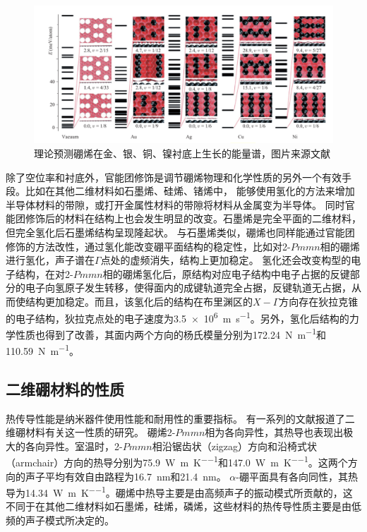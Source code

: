 \begin{figure}[bt]
  \includegraphics[width=1.0\textwidth]{figs/ch1_borophene_energy_spectra.png}
  \centering
  \caption{理论预测硼烯在金、银、铜、镍衬底上生长的能量谱，图片来源文献\cite{zhang2015two}}
  \label{fig:ch1_borophene_energy_spectra}
\end{figure}

除了空位率和衬底外，官能团修饰是调节硼烯物理和化学性质的另外一个有效手段。比如在其他二维材料如石墨烯、硅烯、锗烯中，
能够使用氢化的方法来增加半导体材料的带隙，或打开金属性材料的带隙将材料从金属变为半导体\cite{balog2010bandgap,bhattacharya2011strain,houssa2011electronic}。
同时官能团修饰后的材料在结构上也会发生明显的改变。石墨烯是完全平面的二维材料，但完全氢化后石墨烯结构呈现隆起状。
与石墨烯类似，硼烯也同样能通过官能团修饰的方法改性，通过氢化能改变硼平面结构的稳定性，比如对2-$Pmmn$相的硼烯进行氢化，声子谱在$\Gamma$点处的虚频消失，结构上更加稳定\cite{xu2016hydrogenated,wang2016high}。
氢化还会改变构型的电子结构\cite{xu2016hydrogenated}，在对2-$Pmmn$相的硼烯氢化后，原结构对应电子结构中电子占据的反键部分的电子向氢原子发生转移，使得面内的成键轨道完全占据，反键轨道无占据，从而使结构更加稳定。而且，该氢化后的结构在布里渊区的$X-\Gamma$方向存在狄拉克锥的电子结构，狄拉克点处的电子速度为\SI{3.5e6}{\metre\per\second}\cite{xu2016hydrogenated}。另外，氢化后结构的力学性质也得到了改善，其面内两个方向的杨氏模量分别为\SI{172.24}{\N\per\meter}和\SI{110.59}{\N\per\meter}\cite{wang2016high}。

\subsection{二维硼材料的性质}
热传导性能是纳米器件使用性能和耐用性的重要指标。
有一系列的文献\cite{li2018stretch, mortazavi2018borophene, zhou2017superior, liu2017anisotropic, sun2016first, mortazavi2017anomalous}报道了二维硼材料有关这一性质的研究。
硼烯2-$Pmmn$相为各向异性，其热导也表现出极大的各向异性。室温时，2-$Pmmn$相沿锯齿状（zigzag）方向和沿椅式状（armchair）方向的热导分别为\SI{75.9}{\W\per\meter\per\kelvin}和\SI{147.0}{\W\per\meter\per\kelvin}。这两个方向的声子平均有效自由路程为\SI{16.7}{\nm}和\SI{21.4}{\nm}。
$\alpha$-硼平面具有各向同性，其热导为\SI{14.34}{\W\per\meter\per\kelvin}。硼烯中热导主要是由高频声子的振动模式所贡献的，这不同于在其他二维材料如石墨烯，硅烯，磷烯，这些材料的热传导性质主要是由低频的声子模式所决定的\cite{gu2015first,qin2015anisotropic}。


